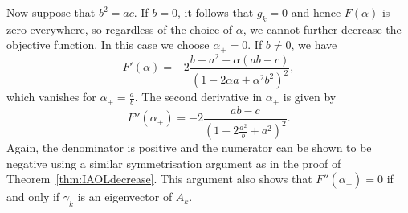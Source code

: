 \documentclass[11pt, onecolumn, journal,compsoc]{IEEEtran}
\theoremstyle{plain}
\theoremstyle{remark}
\begin{document}
Now suppose that $b^2 = ac$. If $b = 0$, it follows that $g_k = 0$ and hence $F(\alpha)$ is zero everywhere, so regardless of the choice of $\alpha$, we cannot further decrease the objective function. In this case we choose $\alpha_+ = 0$. 
If $b\neq 0$, we have \[F'(\alpha) = -2 \frac{b- a^2 +\alpha(ab-c)}{(1-2\alpha a + \alpha^2 b^2)^2},\]
which vanishes for $\alpha_+ = \frac ab$.
The second derivative in $\alpha_+$  is given by \[F''(\alpha_+) = -2\frac{ab-c}{(1-2\tfrac{a^2}{b} +a^2)^2}.\]
Again, the denominator is positive and the numerator can be shown to be negative using a similar symmetrisation argument as in the proof of Theorem~\ref{thm:IAOLdecrease}. This argument also shows that $F''(\alpha_+) = 0$ if and only if $\gamma_k$ is an eigenvector of $A_k$.




\end{document}
